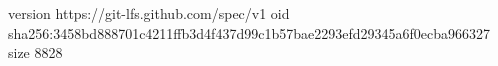 version https://git-lfs.github.com/spec/v1
oid sha256:3458bd888701c4211ffb3d4f437d99c1b57bae2293efd29345a6f0ecba966327
size 8828
